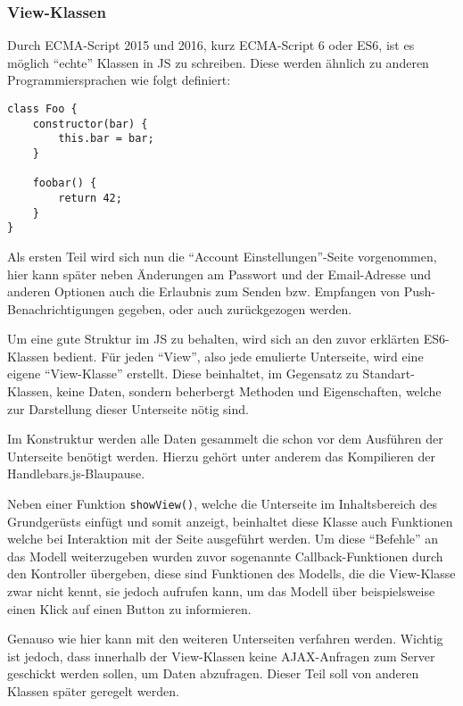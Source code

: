 \documentclass[a4paper,12pt,ngerman,listof=numbered]{scrartcl}      %
\providecommand{\inlinecode}[1]{\texttt{#1}}
\begin{document}
	\subsubsection{View-Klassen}
	Durch ECMA-Script 2015 und 2016, kurz ECMA-Script 6 oder ES6, ist es möglich ``echte'' Klassen in JS zu schreiben. Diese werden ähnlich zu anderen Programmiersprachen wie folgt definiert:\par
	\begin{verbatim}
class Foo {
    constructor(bar) {
        this.bar = bar;
    }
	
    foobar() {
        return 42;
    }
}
	\end{verbatim}
	Als ersten Teil wird sich nun die ``Account Einstellungen''-Seite vorgenommen, hier kann später neben Änderungen am Passwort und der Email-Adresse und anderen Optionen auch die Erlaubnis zum Senden bzw. Empfangen von Push-Be\-nach\-rich\-ti\-gungen gegeben, oder auch zurückgezogen werden.\par
	Um eine gute Struktur im JS zu behalten, wird sich an den zuvor erklärten ES6-Klassen bedient. Für jeden ``View'', also jede emulierte Unterseite, wird eine eigene ``View-Klasse'' erstellt. Diese beinhaltet, im Gegensatz zu Standart-Klassen, keine Daten, sondern beherbergt Methoden und Eigenschaften, welche zur Darstellung dieser Unterseite nötig sind.\par
	Im Konstruktur werden alle Daten gesammelt die schon vor dem Ausführen der Unterseite benötigt werden. Hierzu gehört unter anderem das Kompilieren der Handlebars.js-Blaupause.\par
	Neben einer Funktion \inlinecode{showView()}, welche die Unterseite im Inhaltsbereich des Grundgerüsts einfügt und somit anzeigt, beinhaltet diese Klasse auch Funktionen welche bei Interaktion mit der Seite ausgeführt werden. Um diese ``Befehle'' an das Modell weiterzugeben wurden zuvor sogenannte Callback-Funktionen durch den Kontroller übergeben, diese sind Funktionen des Modells, die die View-Klasse zwar nicht kennt, sie jedoch aufrufen kann, um das Modell über beispielsweise einen Klick auf einen Button zu informieren.\par
	Genauso wie hier kann mit den weiteren Unterseiten verfahren werden. Wichtig ist jedoch, dass innerhalb der View-Klassen keine AJAX-Anfragen zum Server geschickt werden sollen, um Daten abzufragen. Dieser Teil soll von anderen Klassen später geregelt werden.\par
	
\end{document}
